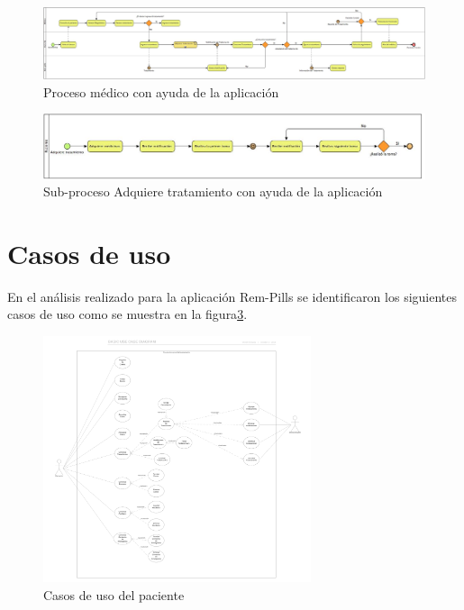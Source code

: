 \begin{figure}[htb]
	\centering
	\includegraphics[width=1.1\textwidth]{images/cap2/Proceso2}
	\caption{Proceso médico con ayuda de la aplicación} \label{fig:proceso2}
\end{figure}

\begin{figure}[htb]
	\centering
	\includegraphics[width=1.1\textwidth]{images/cap2/AdquiereTratamientoP2}
	\caption{Sub-proceso Adquiere tratamiento con ayuda de la aplicación} \label{fig:subproceso2}
\end{figure}



\section{Casos de uso}
En el análisis realizado para la aplicación Rem-Pills se identificaron los siguientes casos de uso como se muestra en la figura\ref{fig:casosdeuso}.

\begin{figure}[htb]
	\centering
	\includegraphics[width=0.7\textwidth]{images/cap2/casosdeuso}
	\caption{Casos de uso del paciente} \label{fig:casosdeuso}
\end{figure} 



